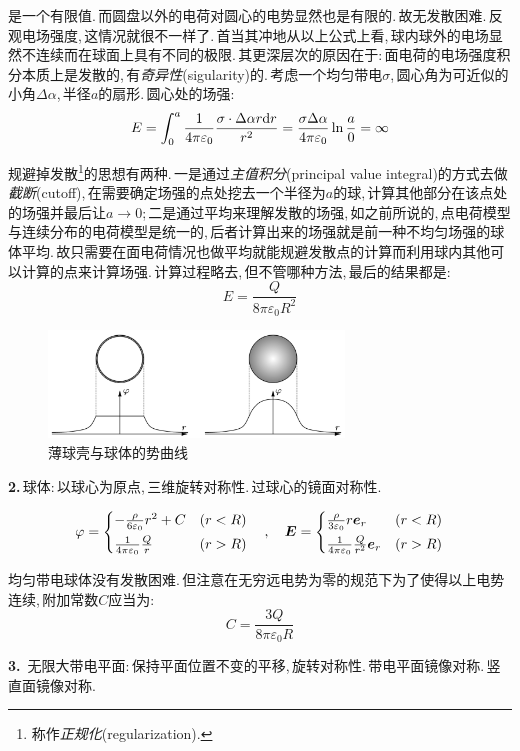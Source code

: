 是一个有限值.\,而圆盘以外的电荷对圆心的电势显然也是有限的.\,故无发散困难.\,反观电场强度,\,这情况就很不一样了.\,首当其冲地从以上公式上看,\,球内球外的电场显然不连续而在球面上具有不同的极限.\,其更深层次的原因在于:\,面电荷的电场强度积分本质上是发散的,\,有\emph{奇异性}(sigularity)的.\,考虑一个均匀带电$\sigma$,\,圆心角为可近似的小角$\Delta\alpha$,\,半径$a$的扇形.\,圆心处的场强:
\[E=\int_0^a \frac{1}{4\pi\varepsilon_0} \frac{\sigma \cdot \Delta \alpha r \textrm{d} r}{r^2}=\frac{\sigma\Delta\alpha}{4\pi\varepsilon_0}\ln\frac{a}{0}=\infty\]

规避掉发散\footnote{称作\emph{正规化}(regularization).}的思想有两种.\,一是通过\emph{主值积分}(principal value integral)的方式去做\emph{截断}(cutoff),\,在需要确定场强的点处挖去一个半径为$a$的球,\,计算其他部分在该点处的场强并最后让$a\to 0$;\,二是通过平均来理解发散的场强,\,如之前所说的,\,点电荷模型与连续分布的电荷模型是统一的,\,后者计算出来的场强就是前一种不均匀场强的球体平均.\,故只需要在面电荷情况也做平均就能规避发散点的计算而利用球内其他可以计算的点来计算场强.\,计算过程略去,\,但不管哪种方法,\,最后的结果都是:
\[E=\frac{Q}{8\pi\varepsilon_0 R^2}\]

\begin{figure}[H]
\centering
\includegraphics[width=0.7\textwidth]{image/7-1-18.png}
\caption{薄球壳与球体的势曲线}\label{fig7-1-18}
\end{figure}

\textbf{2.}\,球体:\,以球心为原点,\,三维旋转对称性.\,过球心的镜面对称性.

\[\varphi=\begin{cases} -\frac{\rho }{6\varepsilon_0}r^2+C& (r<R) \\[3pt] \frac{1}{4\pi\varepsilon_0} \frac{Q}{r} & (r>R) \end{cases} \quad,	\quad \boldsymbol{E}=\begin{cases}  \frac{\rho }{3\varepsilon_0}r \boldsymbol{e}_r & (r<R) \\[3pt] \frac{1}{4\pi\varepsilon_0} \frac{Q}{r^2}\boldsymbol{e}_r & (r>R) \end{cases}\]

均匀带电球体没有发散困难.\,但注意在无穷远电势为零的规范下为了使得以上电势连续,\,附加常数$C$应当为:
\[C=\frac{3Q}{8\pi\varepsilon_0 R}\]

\vspace{0.3cm}
\textbf{3.}\, 无限大带电平面:\,保持平面位置不变的平移,\,旋转对称性.\,带电平面镜像对称.\,竖直面镜像对称.


